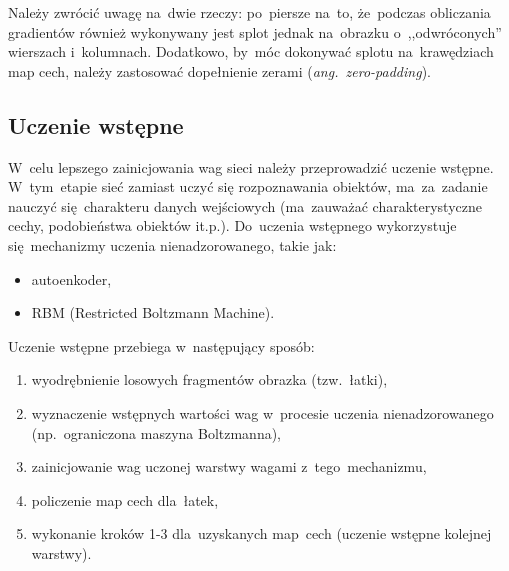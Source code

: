 Należy zwrócić uwagę na~dwie rzeczy: po~piersze na~to, że~podczas obliczania gradientów również wykonywany
jest splot jednak na~obrazku o~,,odwróconych'' wierszach i~kolumnach. Dodatkowo, by~móc dokonywać splotu
na~krawędziach map cech, należy zastosować dopełnienie zerami (\textit{ang.~zero-padding}).

\subsection{Uczenie wstępne}
W~celu lepszego zainicjowania wag sieci należy przeprowadzić uczenie wstępne. W~tym~etapie sieć zamiast uczyć
się rozpoznawania obiektów, ma~za~zadanie nauczyć się~charakteru danych wejściowych (ma~zauważać
charakterystyczne cechy, podobieństwa obiektów it.p.). Do~uczenia wstępnego wykorzystuje się~mechanizmy
uczenia nienadzorowanego, takie jak:
\begin{itemize}
  \item autoenkoder,
  \item RBM (Restricted Boltzmann Machine).
\end{itemize}

Uczenie wstępne przebiega w~następujący sposób:
\begin{enumerate}
  \item wyodrębnienie losowych fragmentów obrazka (tzw.~łatki),
  \item wyznaczenie wstępnych wartości wag w~procesie uczenia nienadzorowanego (np.~ograniczona maszyna Boltzmanna),
  \item zainicjowanie wag uczonej warstwy wagami z~tego~mechanizmu,
  \item policzenie map cech dla~łatek,
  \item wykonanie kroków 1-3 dla~uzyskanych map~cech (uczenie wstępne kolejnej warstwy).
\end{enumerate}
